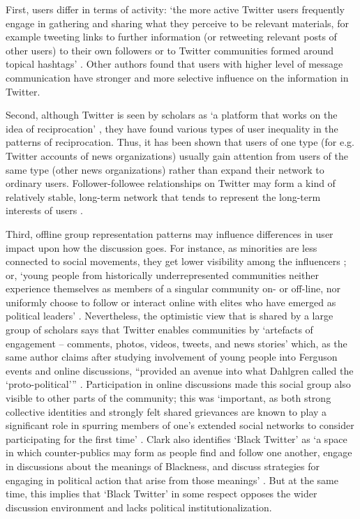 First, users differ in terms of activity: ‘the more active Twitter users frequently engage in gathering and sharing what they perceive to be relevant materials, for example tweeting links to further information (or retweeting relevant posts of other users) to their own followers or to Twitter communities formed around topical hashtags’ \cite{BrunsBurgees2012}. Other authors \cite{BastosRaimundoTravitzki} found that users with higher level of message communication have stronger and more selective influence on the information in Twitter.

Second, although Twitter is seen by scholars as ‘a platform that works on the idea of reciprocation’ \cite{GroshekTandoc}, they have found various types of user inequality in the patterns of reciprocation. Thus, it has been shown that users of one type (for e.g. Twitter accounts of news organizations) usually gain attention from users of the same type (other news organizations) \cite{WuHofmanMason} rather than expand their network to ordinary users. Follower-followee relationships on Twitter may form a kind of relatively stable, long-term network that tends to represent the long-term interests of users \cite{BrunsBurgees2012}.

Third, offline group representation patterns may influence differences in user impact upon how the discussion goes. For instance, as minorities are less connected to social movements, they get lower visibility among the influencers \cite{Juris,Clark,BodrunovaLitvinenko2013}; or, ‘young people from historically underrepresented communities neither experience themselves as members of a singular community on- or off-line, nor uniformly choose to follow or interact online with elites who have emerged as political leaders’ \cite{Clark}. Nevertheless, the optimistic view that is shared by a large group of scholars says that Twitter enables communities by ‘artefacts of engagement -- comments, photos, videos, tweets, and news stories’ \cite[p. 239]{Clark} which, as the same author claims after studying involvement of young people into Ferguson events and online discussions, “provided an avenue into what Dahlgren called the ‘proto-political’” \cite{Dahlgren}\cite[p. 244]{Clark}. Participation in online discussions made this social group also visible to other parts of the community; this was ‘important, as both strong collective identities and strongly felt shared grievances are known to play a significant role in spurring members of one’s extended social networks to consider participating for the first time’ \cite[p. 244]{Clark}. Clark also identifies ‘Black Twitter’ as ‘a space in which counter-publics may form as people find and follow one another, engage in discussions about the meanings of Blackness, and discuss strategies for engaging in political action that arise from those meanings’ \cite[p. 239]{Clark}. But at the same time, this implies that ‘Black Twitter’ in some respect opposes the wider discussion environment and lacks political institutionalization.


